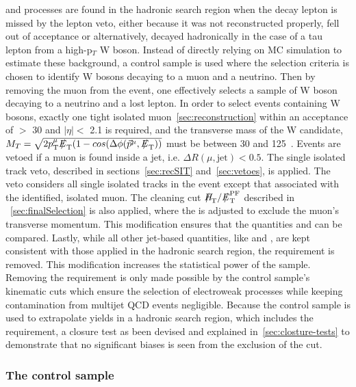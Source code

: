 \wj and \ttbar processes are found in the hadronic search region 
when the decay lepton is missed by the lepton veto, either 
because it was not reconstructed properly, fell out of acceptance 
or alternatively, decayed hadronically in the case of a tau lepton 
from a high-p$_{T}$ W boson. Instead of directly relying on MC 
simulation to estimate these background, a \mj control sample is 
used where the selection criteria is chosen to identify W bosons 
decaying to a muon and a neutrino. Then by removing the muon from 
the event, one effectively selects a sample of W boson decaying to 
a neutrino and a lost lepton. In order to select events containing 
W bosons, exactly one tight isolated muon~\ref{sec:reconstruction} 
within an acceptance of \PT $>$ 30 \gev and $|\eta| <$ 2.1 is required, 
and the transverse mass of the W candidate, 
$M_{T} = \sqrt{2\pt^{\mu}\met(1-cos(\Delta\phi(\vec{p}^{\rm  \mu},\met))}$ 
must be between 30 and 125~\gev.  Events are vetoed if a muon is found inside
a jet, i.e. $\Delta R(\mu,\textrm{jet}) < 0.5$. The single isolated track 
veto, described in sections~\ref{sec:recSIT} and~\ref{sec:vetoes}, is applied. 
The veto considers all single isolated tracks in the event except 
that associated with the identified, isolated muon. The cleaning cut 
$\mht/\pfmet$ described in ~\ref{sec:finalSelection} is also applied, 
where the \pfmet is adjusted to exclude the muon's transverse momentum.
This modification ensures that the quantities \mht and \pfmet can be 
compared. Lastly, while all other jet-based quantities, like \scalht 
and \mht, are kept consistent with those applied in the hadronic 
search region, the \alphat requirement is removed. This modification 
increases the statistical power of the sample. Removing the \alphat 
requirement is only made possible by the control sample's kinematic 
cuts which ensure the selection of electroweak processes while keeping
contamination from multijet QCD events negligible. Because the control 
sample is used to extrapolate yields in a hadronic search region, 
which includes the \alphat requirement, a closure test as been devised 
and explained in~\ref{sec:closture-tests} to demonstrate that no 
significant biases is seen from the exclusion of the \alphat cut.

\subsubsection{The \texorpdfstring{\gj}{photon plus jets} control sample}


